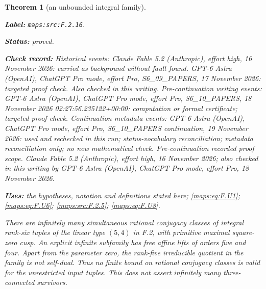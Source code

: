 \documentclass[11pt,a4paper]{article}
\newtheorem{theorem}{Theorem}[section]
\theoremstyle{definition}
\newcommand{\StatementRecord}[4]{\par\smallskip\begingroup\upshape\raggedright\noindent\textbf{Label:} \nolinkurl{#1}.\par\noindent\textbf{Status:} #2.\par\noindent\textbf{Check record:} #3.\par\noindent\textbf{Uses:} #4.\par\endgroup\smallskip}
\begin{document}
\begin{theorem}[an unbounded integral family]\label{maps:src:F.2.16}
\StatementRecord{maps:src:F.2.16}{proved}{Historical events: Claude Fable 5.2 (Anthropic), effort high, 16 November 2026: carried as background without fault found. GPT-6 Astra (OpenAI), ChatGPT Pro mode, effort Pro, S6\_09\_PAPERS, 17 November 2026: targeted proof check. Also checked in this writing. Pre-continuation writing events: GPT-6 Astra (OpenAI), ChatGPT Pro mode, effort Pro, S6\_10\_PAPERS, 18 November 2026 02:27:56.235122+00:00: computation or formal certificate; targeted proof check. Continuation metadata events: GPT-6 Astra (OpenAI), ChatGPT Pro mode, effort Pro, S6\_10\_PAPERS continuation, 19 November 2026: used and rechecked in this run; status-vocabulary reconciliation; metadata reconciliation only; no new mathematical check. \emph{Pre-continuation recorded proof scope.} Claude Fable 5.2 (Anthropic), effort high, 16 November 2026; also checked in this writing by GPT-6 Astra (OpenAI), ChatGPT Pro mode, effort Pro, 18 November 2026}{the hypotheses, notation and definitions stated here; \cref{maps:eq:F.U1}; \cref{maps:eq:F.U6}; \cref{maps:src:F.2.5}; \cref{maps:eq:F.U8}}


There are infinitely many simultaneous rational conjugacy classes
of integral rank-six tuples of the linear type $(5,4)$ in F.2,
with primitive maximal square-zero cusp.  An explicit infinite
subfamily has free affine lifts of orders five and four.
Apart from the parameter zero, the rank-five irreducible quotient
in the family is not self-dual.  Thus no finite bound on rational
conjugacy classes is valid for the unrestricted input tuples.
This does not assert infinitely many three-connected survivors.

\end{theorem}
\end{document}
